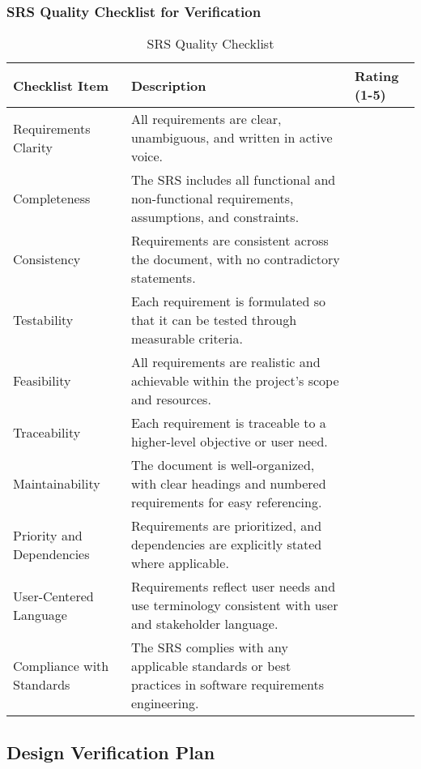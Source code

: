 \documentclass[12pt, titlepage]{article}
\begin{document}
\newpage

\subsubsection{SRS Quality Checklist for Verification}
\begin{table}[h!]
\caption{SRS Quality Checklist}
\begin{tabular}{|>{\raggedright\arraybackslash}p{3cm}|>{\raggedright\arraybackslash}p{9cm}|>{\raggedright\arraybackslash}p{2cm}|}
	\hline
	\textbf{Checklist Item} & \textbf{Description} & \textbf{Rating (1-5)} \\
	\hline
	Requirements Clarity & All requirements are clear, unambiguous, and written in active voice. & \\
	\hline
	Completeness & The SRS includes all functional and non-functional requirements, assumptions, and constraints. & \\
	\hline
	Consistency & Requirements are consistent across the document, with no contradictory statements. & \\
	\hline
	Testability & Each requirement is formulated so that it can be tested through measurable criteria. & \\
	\hline
	Feasibility & All requirements are realistic and achievable within the project's scope and resources. & \\
	\hline
	Traceability & Each requirement is traceable to a higher-level objective or user need. & \\
	\hline
	Maintainability	& The document is well-organized, with clear headings and numbered requirements for easy referencing. & \\
	\hline
	Priority and Dependencies & Requirements are prioritized, and dependencies are explicitly stated where applicable. & \\
	\hline
	User-Centered Language & Requirements reflect user needs and use terminology consistent with user and stakeholder language. & \\
	\hline
	Compliance with Standards & The SRS complies with any applicable standards or best practices in software requirements engineering. & \\
	\hline

\end{tabular}
\end{table}

\newpage

\subsection{Design Verification Plan}
\end{document}
